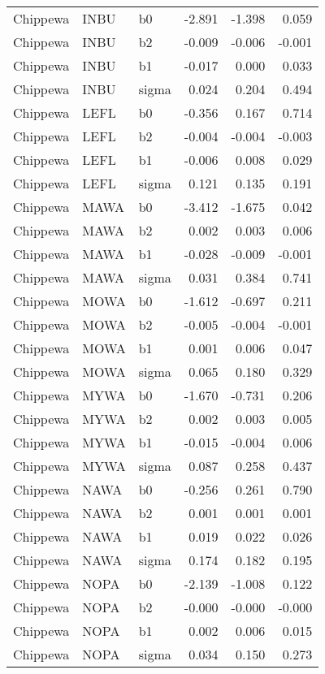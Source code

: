 \begin{table}[ht]
\begin{center}
\begin{tabular}{lllrrr}
  Chippewa & INBU & b0 & -2.891 & -1.398 & 0.059 \\ 
  Chippewa & INBU & b2 & -0.009 & -0.006 & -0.001 \\ 
  Chippewa & INBU & b1 & -0.017 & 0.000 & 0.033 \\ 
  Chippewa & INBU & sigma & 0.024 & 0.204 & 0.494 \\ 
  Chippewa & LEFL & b0 & -0.356 & 0.167 & 0.714 \\ 
  Chippewa & LEFL & b2 & -0.004 & -0.004 & -0.003 \\ 
  Chippewa & LEFL & b1 & -0.006 & 0.008 & 0.029 \\ 
  Chippewa & LEFL & sigma & 0.121 & 0.135 & 0.191 \\ 
  Chippewa & MAWA & b0 & -3.412 & -1.675 & 0.042 \\ 
  Chippewa & MAWA & b2 & 0.002 & 0.003 & 0.006 \\ 
  Chippewa & MAWA & b1 & -0.028 & -0.009 & -0.001 \\ 
  Chippewa & MAWA & sigma & 0.031 & 0.384 & 0.741 \\ 
  Chippewa & MOWA & b0 & -1.612 & -0.697 & 0.211 \\ 
  Chippewa & MOWA & b2 & -0.005 & -0.004 & -0.001 \\ 
  Chippewa & MOWA & b1 & 0.001 & 0.006 & 0.047 \\ 
  Chippewa & MOWA & sigma & 0.065 & 0.180 & 0.329 \\ 
  Chippewa & MYWA & b0 & -1.670 & -0.731 & 0.206 \\ 
  Chippewa & MYWA & b2 & 0.002 & 0.003 & 0.005 \\ 
  Chippewa & MYWA & b1 & -0.015 & -0.004 & 0.006 \\ 
  Chippewa & MYWA & sigma & 0.087 & 0.258 & 0.437 \\ 
  Chippewa & NAWA & b0 & -0.256 & 0.261 & 0.790 \\ 
  Chippewa & NAWA & b2 & 0.001 & 0.001 & 0.001 \\ 
  Chippewa & NAWA & b1 & 0.019 & 0.022 & 0.026 \\ 
  Chippewa & NAWA & sigma & 0.174 & 0.182 & 0.195 \\ 
  Chippewa & NOPA & b0 & -2.139 & -1.008 & 0.122 \\ 
  Chippewa & NOPA & b2 & -0.000 & -0.000 & -0.000 \\ 
  Chippewa & NOPA & b1 & 0.002 & 0.006 & 0.015 \\ 
  Chippewa & NOPA & sigma & 0.034 & 0.150 & 0.273 \\ 

\end{tabular}
\end{center}
\end{table}
